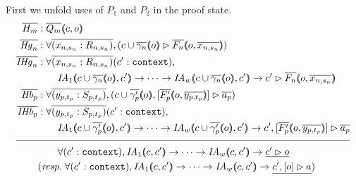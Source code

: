 First we unfold uses of $P_1$ and $P_2$ in the proof state.
\begin{align*}
\ol{H_m} &: \ol{Q_m} \args{c , o} \\
\ol{\mathit{Hg}_n} &: \forall \ol{(x_{n,s_n} : R_{n,s_n})}, (\seqsl[c \cup \ol{\gamma_n} \args{o}]{\ol{F_n} \args{o , \ol{x_{n,s_n}}})} \\
\ol{\mathit{IHg}_n} &: \forall \ol{(x_{n,s_n} : R_{n,s_n})} (\inddyncon{} : \sltm{context}), \\
& \qquad \mathit{IA}_1 \args{c \cup \ol{\gamma_n} \args{o} , \inddyncon{}} \rightarrow \dots \rightarrow \mathit{IA}_w \args{c \cup \ol{\gamma_n} \args{o} , \inddyncon{}} \rightarrow \seqsl[\inddyncon{}]{\ol{F_n} \args{o , \ol{x_{n,s_n}}}} \\
\ol{\mathit{Hb}_p} &: \forall \ol{(y_{p,t_p} : S_{p,t_p})}, (\bchsl[c \cup \ol{\gamma'_p} \args{o}]{\ol{F'_p} \args{o , \ol{y_{p,t_p}}}}{\ol{a_p}}) \\
\ol{\mathit{IHb}_p} &: \forall \ol{(y_{p,t_p} : S_{p,t_p})} (\inddyncon{} : \sltm{context}), \\
& \qquad \mathit{IA}_1 \args{c \cup \ol{\gamma'_p} \args{o} , \inddyncon{}} \rightarrow \dots \rightarrow \mathit{IA}_w \args{c \cup \ol{\gamma'_p} \args{o} , \inddyncon{}} \rightarrow \bchsl[\inddyncon{}]{\ol{F'_p} \args{o , \ol{y_{p,t_p}}}}{\ol{a_p}} \\[\pfshift{}]
\cline{1-2}
& \qquad \forall (\inddyncon{} : \sltm{context}), \mathit{IA}_1 \args{c,\inddyncon{}} \rightarrow \dots \rightarrow \mathit{IA}_w \args{c,\inddyncon{}} \rightarrow \underline{\seqsl[\inddyncon{}]{o}} \\
& (\mathit{resp.} \; \forall (\inddyncon{} : \sltm{context}), \mathit{IA}_1 \args{c,\inddyncon{}} \rightarrow \dots \rightarrow \mathit{IA}_w \args{c,\inddyncon{}} \rightarrow \underline{\bchsl[\inddyncon{}]{o}{a}})
\end{align*}


